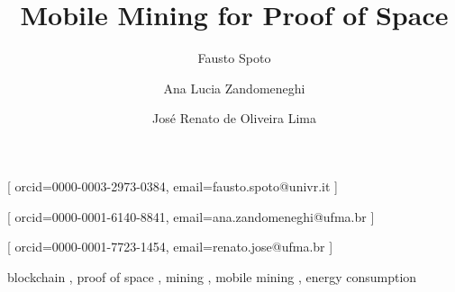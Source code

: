 \documentclass[
]{ceurart}
\begin{document}


\title{Mobile Mining for Proof of Space}

\author[1]{Fausto Spoto}[%
orcid=0000-0003-2973-0384,
email=fausto.spoto@univr.it
]
\cormark[1]
\fnmark[1]
\address[1]{Dipartimento di Informatica, Universit\`a di Verona, Verona, Italy}

\author[2]{Ana Lucia Zandomeneghi}[%
orcid=0000-0001-6140-8841,
email=ana.zandomeneghi@ufma.br
]
\fnmark[1]
\author[2]{Jos\'e Renato de Oliveira Lima}[%
orcid=0000-0001-7723-1454,
email=renato.jose@ufma.br
]
\fnmark[1]
\address[2]{Bacharelado Interdisciplinar em Ci\^encia e Tecnologia (BICT), UFMA, S\~ao Lu\'{\i}s do Maranh\~ao, Brazil}


\maketitle

\begin{keywords}
  blockchain \sep
  proof of space \sep
  mining \sep
  mobile mining \sep
  energy consumption
\end{keywords}




\end{document}

